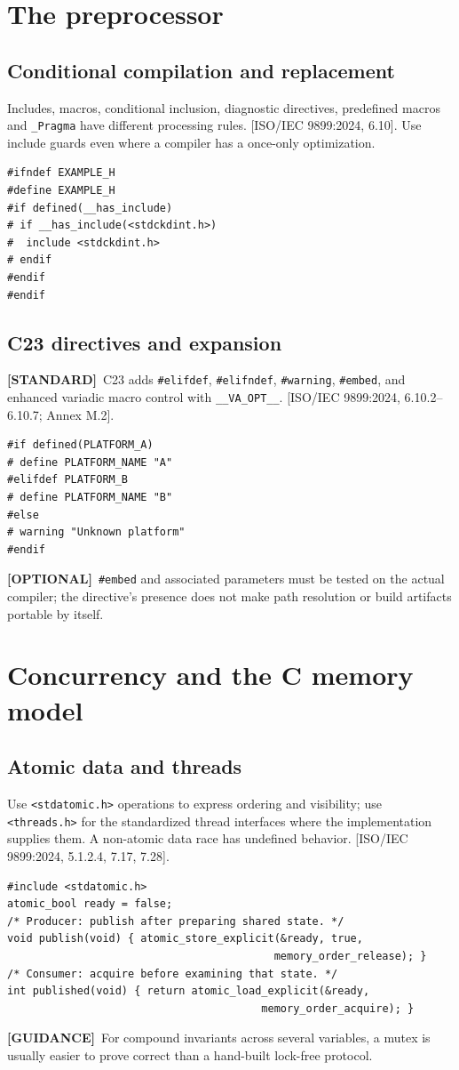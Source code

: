 \documentclass[10pt,letterpaper,oneside]{report}
\newcommand{\refcl}[1]{\textsf{\footnotesize[ISO/IEC 9899:2024, #1]}}
\newcommand{\standard}{\textbf{[STANDARD]}}
\newcommand{\optional}{\textbf{[OPTIONAL]}}
\newcommand{\guidance}{\textbf{[GUIDANCE]}}
\begin{document}
\chapter{The preprocessor}
\section{Conditional compilation and replacement}
Includes, macros, conditional inclusion, diagnostic directives, predefined macros and \texttt{\_Pragma} have different processing rules. \refcl{6.10}. Use include guards even where a compiler has a once-only optimization.
\begin{lstlisting}
#ifndef EXAMPLE_H
#define EXAMPLE_H
#if defined(__has_include)
# if __has_include(<stdckdint.h>)
#  include <stdckdint.h>
# endif
#endif
#endif
\end{lstlisting}
\section{C23 directives and expansion}
\standard\ C23 adds \texttt{\#elifdef}, \texttt{\#elifndef}, \texttt{\#warning}, \texttt{\#embed}, and enhanced variadic macro control with \texttt{\_\_VA\_OPT\_\_}. \refcl{6.10.2--6.10.7; Annex M.2}.
\begin{lstlisting}
#if defined(PLATFORM_A)
# define PLATFORM_NAME "A"
#elifdef PLATFORM_B
# define PLATFORM_NAME "B"
#else
# warning "Unknown platform"
#endif
\end{lstlisting}
\optional\ \texttt{\#embed} and associated parameters must be tested on the actual compiler; the directive's presence does not make path resolution or build artifacts portable by itself.
\chapter{Concurrency and the C memory model}
\section{Atomic data and threads}
Use \texttt{<stdatomic.h>} operations to express ordering and visibility; use \texttt{<threads.h>} for the standardized thread interfaces where the implementation supplies them. A non-atomic data race has undefined behavior. \refcl{5.1.2.4, 7.17, 7.28}.
\begin{lstlisting}
#include <stdatomic.h>
atomic_bool ready = false;
/* Producer: publish after preparing shared state. */
void publish(void) { atomic_store_explicit(&ready, true,
                                          memory_order_release); }
/* Consumer: acquire before examining that state. */
int published(void) { return atomic_load_explicit(&ready,
                                        memory_order_acquire); }
\end{lstlisting}
\guidance\ For compound invariants across several variables, a mutex is usually easier to prove correct than a hand-built lock-free protocol.
\end{document}
